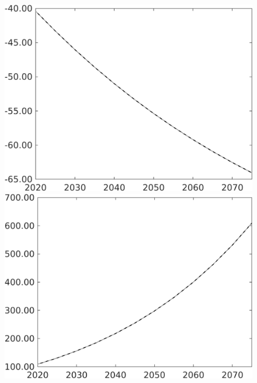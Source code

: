 \documentclass[12pt]{article}
\begin{document}
\begin{figure}[h!!]
\begin{minipage}[]{0.32\textwidth}
	\end{minipage}	
	\begin{minipage}[]{0.32\textwidth}
		\includegraphics[width=1\textwidth]{../../codding_model/own_basedOnFried/optimalPol_010922_revision/figures/all_13Sept22/PerdifNoTauf_regime0_CompTaul_F_spillover0_nsk1_xgr0_knspil1_sep1_LFlimit0_emsbase0_countec0_GovRev0_etaa0.79_lgd0.png}
	\end{minipage}	
	\begin{minipage}[]{0.32\textwidth}
		\includegraphics[width=1\textwidth]{../../codding_model/own_basedOnFried/optimalPol_010922_revision/figures/all_13Sept22/PerdifNoTauf_regime0_CompTaul_G_spillover0_nsk1_xgr0_knspil1_sep1_LFlimit0_emsbase0_countec0_GovRev0_etaa0.79_lgd0.png}

\end{minipage}
\end{figure}
\end{document}
